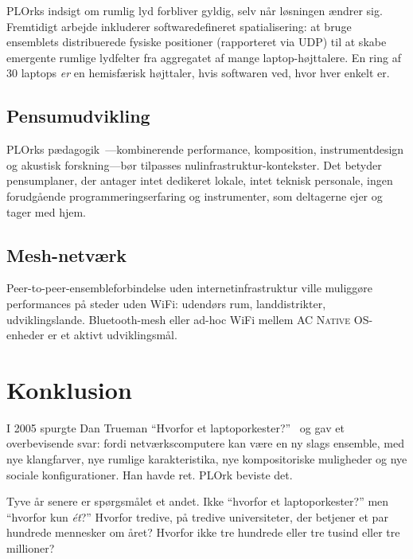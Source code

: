 \documentclass[10pt,letterpaper,twocolumn]{article}
\newcommand{\acos}{\textsc{AC Native OS}}
\begin{document}
PLOrks indsigt om rumlig lyd forbliver gyldig, selv n{\aa}r l{\o}sningen {\ae}ndrer sig. Fremtidigt arbejde inkluderer softwaredefineret spatialisering: at bruge ensemblets distribuerede fysiske positioner (rapporteret via UDP) til at skabe emergente rumlige lydfelter fra aggregatet af mange laptop-h{\o}jttalere. En ring af 30 laptops \emph{er} en hemisf{\ae}risk h{\o}jttaler, hvis softwaren ved, hvor hver enkelt er.

\subsection{Pensumudvikling}

PLOrks p{\ae}dagogik~\citep{trueman2007why}---kombinerende performance, komposition, instrumentdesign og akustisk forskning---b{\o}r tilpasses nulinfrastruktur-kontekster. Det betyder pensumplaner, der antager intet dedikeret lokale, intet teknisk personale, ingen forudg{\aa}ende programmeringserfaring og instrumenter, som deltagerne ejer og tager med hjem.

\subsection{Mesh-netv{\ae}rk}

Peer-to-peer-ensembleforbindelse uden internetinfrastruktur ville muligg{\o}re performances p{\aa} steder uden WiFi: udend{\o}rs rum, landdistrikter, udviklingslande. Bluetooth-mesh eller ad-hoc WiFi mellem \acos{}-enheder er et aktivt udviklingsm{\aa}l.


\section{Konklusion}

I 2005 spurgte Dan Trueman ``Hvorfor et laptoporkester?''~\citep{trueman2007why} og gav et overbevisende svar: fordi netv{\ae}rkscomputere kan v{\ae}re en ny slags ensemble, med nye klangfarver, nye rumlige karakteristika, nye kompositoriske muligheder og nye sociale konfigurationer. Han havde ret. PLOrk beviste det.

Tyve {\aa}r senere er sp{\o}rgsm{\aa}let et andet. Ikke ``hvorfor et laptoporkester?'' men ``hvorfor kun \emph{\'{e}t}?'' Hvorfor tredive, p{\aa} tredive universiteter, der betjener et par hundrede mennesker om {\aa}ret? Hvorfor ikke tre hundrede eller tre tusind eller tre millioner?
\end{document}
